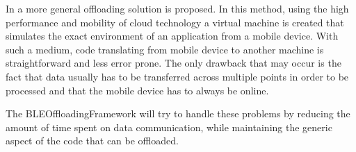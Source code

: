 In \cite{CloneCloud} a more general offloading solution is proposed. In this method, using the high performance and mobility of cloud technology a virtual machine is created that simulates the exact environment of an application from a mobile device. With such a medium, code translating from mobile device to another machine is straightforward and less error prone. The only drawback that may occur is the fact that data usually has to be transferred across multiple points in order to be processed and that the mobile device has to always be online.

The BLEOffloadingFramework will try to handle these problems by reducing the amount of time spent on data communication, while maintaining the generic aspect of the code that can be offloaded. 

